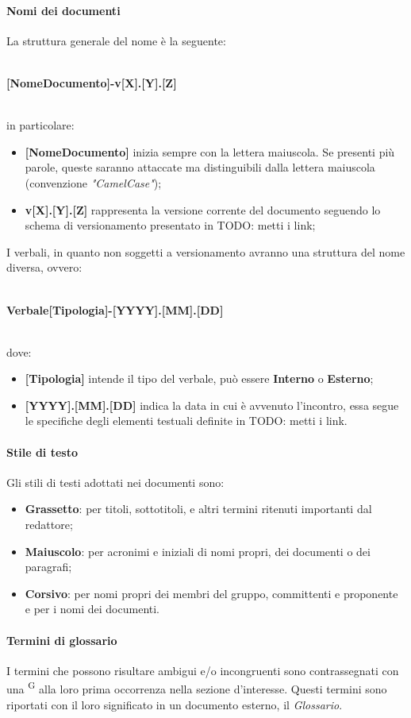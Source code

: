 \paragraph{Nomi dei documenti}
La struttura generale del nome è la seguente: \\ \\
\centerline{\textbf{[NomeDocumento]-v[X].[Y].[Z]}}\\
in particolare:
\begin{itemize}
\item \textbf{[NomeDocumento]} inizia sempre con la lettera maiuscola. Se presenti più parole, queste saranno attaccate ma distinguibili dalla lettera maiuscola (convenzione \textit{"CamelCase"});
\item \textbf{v[X].[Y].[Z]} rappresenta la versione corrente del documento seguendo lo schema di versionamento presentato in TODO: metti i link;
\end{itemize}
I verbali, in quanto non soggetti a versionamento avranno una struttura del nome diversa, ovvero:\\ \\
\centerline{\textbf{Verbale[Tipologia]-[YYYY].[MM].[DD]}} \\
dove:
\begin{itemize}
\item \textbf{[Tipologia]} intende il tipo del verbale, può essere \textbf{Interno} o \textbf{Esterno};
\item \textbf{[YYYY].[MM].[DD]} indica la data in cui è avvenuto l'incontro, essa segue le specifiche degli elementi testuali definite in TODO: metti i link.
\end{itemize}


\paragraph{Stile di testo}
Gli stili di testi adottati nei documenti sono:
\begin{itemize}
\item \textbf{Grassetto}: per titoli, sottotitoli, e altri termini ritenuti importanti dal redattore;
\item \textbf{Maiuscolo}: per acronimi e iniziali di nomi propri, dei documenti o dei paragrafi;
\item \textbf{Corsivo}: per nomi propri dei membri del gruppo, committenti e proponente e per i nomi dei documenti.
\end{itemize}


\paragraph{Termini di glossario}
I termini che possono risultare ambigui e/o incongruenti sono contrassegnati con una \textsuperscript{G} alla loro prima occorrenza nella sezione d’interesse. Questi termini sono riportati con il loro significato in un documento esterno, il \textit{Glossario}.

